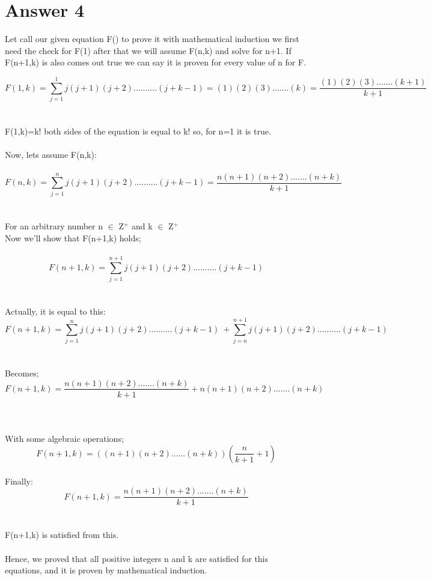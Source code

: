 \documentclass[12pt]{article}
\begin{document}
\section*{Answer 4}

Let call our given equation F() to prove it with mathematical induction we first need the check for F(1) after that we will assume F(n,k) and solve for n+1. If F(n+1,k) is also comes out true we can say it is proven for every value of n for F.

\[F(1,k) = \sum_{j=1}^{1}j(j+1)(j+2)..........(j+k-1)=(1)(2)(3).......(k)=\frac{(1)(2)(3).......(k+1)}{k+1}\]\\
\\
F(1,k)=k! both sides of the equation is equal to k! so, for n=1 it is true.\\
\\

Now, lets assume F(n,k):\\
\\
\[F(n,k) = \sum_{j=1}^{n}j(j+1)(j+2)..........(j+k-1)=\frac{n(n+1)(n+2).......(n+k)}{k+1}\]\\
\\
For an arbitrary number n $\in$ Z$^+$ and k $\in$ Z$^+$\\

Now we'll show that F(n+1,k) holds;\\
\\
\[F(n+1,k) = \sum_{j=1}^{n+1}j(j+1)(j+2)..........(j+k-1)\]\\
\\
Actually, it is equal to this:\\

\[F(n+1,k) = \sum_{j=1}^{n}j(j+1)(j+2)..........(j+k-1)\ + \sum_{j=n}^{n+1}j(j+1)(j+2)..........(j+k-1)\]\\
\\Becomes;
\[F(n+1,k) = \frac{n(n+1)(n+2).......(n+k)}{k+1} + n(n+1)(n+2).......(n+k) \]\\
\\
\\With some algebraic operations;
\[F(n+1,k)=((n+1)(n+2)......(n+k))(\frac{n}{k+1}+1)\]\\
Finally:\\
\[F(n+1,k) = \frac{n(n+1)(n+2).......(n+k)}{k+1}\]\\
\\

F(n+1,k) is satisfied from this.\\
\\
Hence, we proved that all positive integers n and k are satisfied for this equations, and it is proven by mathematical induction.
\end{document}
